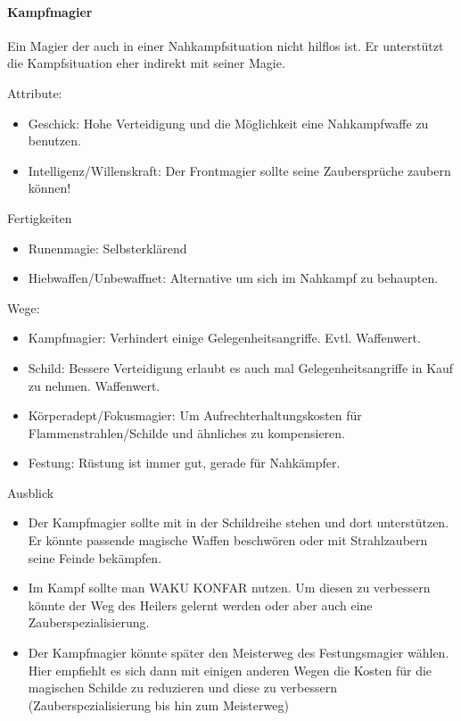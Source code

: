 \documentclass{article}
\begin{document}
\paragraph{Kampfmagier}
Ein Magier der auch in einer Nahkampfsituation nicht hilflos ist. Er unterstützt die Kampfsituation eher indirekt mit
seiner Magie.

Attribute:
\begin{itemize}
\item Geschick: Hohe Verteidigung und die Möglichkeit eine Nahkampfwaffe zu benutzen.
\item Intelligenz/Willenskraft: Der Frontmagier sollte seine Zaubersprüche zaubern können!
\end{itemize}

Fertigkeiten
\begin{itemize}
\item Runenmagie: Selbsterklärend
\item Hiebwaffen/Unbewaffnet: Alternative um sich im Nahkampf zu behaupten.
\end{itemize}

Wege:
\begin{itemize}
\item Kampfmagier: Verhindert einige Gelegenheitsangriffe. Evtl. Waffenwert.
\item Schild: Bessere Verteidigung erlaubt es auch mal Gelegenheitsangriffe in Kauf zu nehmen. Waffenwert.
\item Körperadept/Fokusmagier: Um Aufrechterhaltungskosten für Flammenstrahlen/Schilde und ähnliches zu kompensieren.
\item Festung: Rüstung ist immer gut, gerade für Nahkämpfer.
\end{itemize}

Ausblick
\begin{itemize}
\item Der Kampfmagier sollte mit in der Schildreihe stehen und dort unterstützen. Er könnte passende magische Waffen beschwören oder mit Strahlzaubern seine Feinde bekämpfen.
\item Im Kampf sollte man WAKU KONFAR nutzen. Um diesen zu verbessern könnte der Weg des Heilers gelernt werden oder aber auch eine Zauberspezialisierung.
\item Der Kampfmagier könnte später den Meisterweg des Festungsmagier wählen. Hier empfiehlt es sich dann mit einigen anderen Wegen die Kosten für die magischen Schilde zu reduzieren und diese zu verbessern (Zauberspezialisierung bis hin zum Meisterweg)
\end{itemize}
\end{document}
